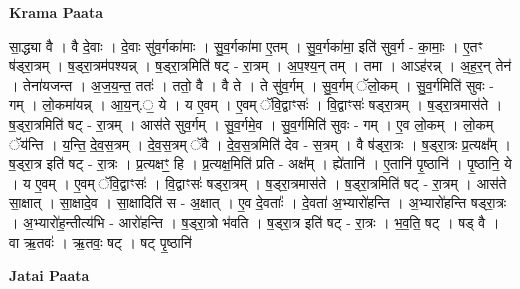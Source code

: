 \documentclass[17pt]{extarticle}
\begin{document}
\textbf{Krama Paata} \newline

सा॒द्ध्या वै । वै दे॒वाः । दे॒वाः सु॑व॒र्गका॑माः । सु॒व॒र्गका॑मा ए॒तम् । सु॒व॒र्गका॑मा॒ इति॑ सुव॒र्ग - का॒माः॒ । ए॒तꣳ ष॑ड्‍रा॒त्रम् । ष॒ड्‍रा॒त्रम॑पश्यन्न् । ष॒ड्‍रा॒त्रमिति॑ षट् - रा॒त्रम् । अ॒प॒श्य॒न् तम् । तमा । आऽह॑रन्न् । अ॒ह॒र॒न् तेन॑ । तेना॑यजन्त । अ॒ज॒य॒न्त॒ ततः॑ । ततो॒ वै । वै ते । ते सु॑व॒र्गम् । सु॒व॒र्गम् ॅलो॒कम् । सु॒व॒र्गमिति॑ सुवः - गम् । लो॒कमा॑यन्न् । आ॒य॒न्.॒ ये । य ए॒वम् । ए॒वम् ॅवि॒द्वाꣳसः॑ । वि॒द्वाꣳसः॑ षड्‍रा॒त्रम् । ष॒ड्‍रा॒त्रमास॑ते । ष॒ड्‍रा॒त्रमिति॑ षट् - रा॒त्रम् । आस॑ते सुव॒र्गम् । सु॒व॒र्गमे॒व । सु॒व॒र्गमिति॑ सुवः - गम् । ए॒व लो॒कम् । लो॒कम् ॅय॑न्ति । य॒न्ति॒ दे॒व॒स॒त्रम् । दे॒व॒स॒त्रम् ॅवै । दे॒व॒स॒त्रमिति॑ देव - स॒त्रम् । वै ष॑ड्‍रा॒त्रः । ष॒ड्‍रा॒त्रः प्र॒त्यक्ष᳚म् । ष॒ड्‍रा॒त्र इति॑ षट् - रा॒त्रः । प्र॒त्यक्षꣳ॒॒ हि । प्र॒त्यक्ष॒मिति॑ प्रति - अक्ष᳚म् । ह्ये॑तानि॑ । ए॒तानि॑ पृ॒ष्ठानि॑ । पृ॒ष्ठानि॒ ये । य ए॒वम् । ए॒वम् ॅवि॒द्वाꣳसः॑ । वि॒द्वाꣳसः॑ षड्‍रा॒त्रम् । ष॒ड्‍रा॒त्रमास॑ते । ष॒ड्‍रा॒त्रमिति॑ षट् - रा॒त्रम् । आस॑ते सा॒क्षात् । सा॒क्षादे॒व । सा॒क्षादिति॑ स - अ॒क्षात् । ए॒व दे॒वताः᳚ । दे॒वता॑ अ॒भ्यारो॑हन्ति । अ॒भ्यारो॑हन्ति षड्‍रा॒त्रः । अ॒भ्यारो॑ह॒न्तीत्य॑भि - आरो॑हन्ति । ष॒ड्‍रा॒त्रो भ॑वति । ष॒ड्‍रा॒त्र इति॑ षट् - रा॒त्रः । भ॒व॒ति॒ षट् । षड् वै । वा ऋ॒तवः॑ । ऋ॒तवः॒ षट् । षट् पृ॒ष्ठानि॑ \newline

\textbf{Jatai Paata} \newline
\end{document}
